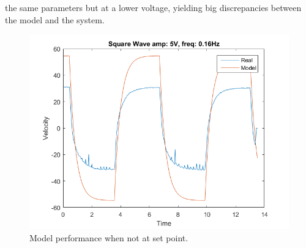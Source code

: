 \documentclass[12pt,a4paper]{article}
\begin{document}
the same parameters but at a lower voltage, yielding big discrepancies between
the model and the system.
\begin{figure}[H]
    \centering
    \includegraphics[width=0.5\linewidth]{l1_sq_a5_f016.png}
    \caption{Model performance when not at set point.}
    \label{fig:parameter_id_bad}
\end{figure}
\end{document}
